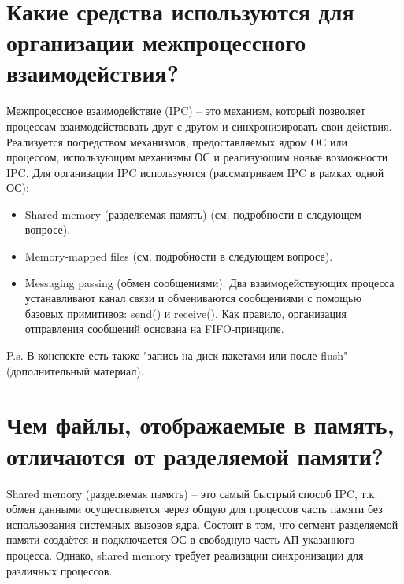 \documentclass[a4paper,12pt]{article}	%
\title{
	\center{\textbf{CQ 21.}}
	}
\begin{document}

\maketitle


\section{Какие средства используются для организации межпроцессного взаимодействия?}
	
	Межпроцессное взаимодействие (IPC) -- это механизм, который позволяет процессам взаимодействовать друг с другом и синхронизировать свои действия. Реализуется посредством механизмов, предоставляемых ядром ОС или процессом, использующим механизмы ОС и реализующим новые возможности IPC. Для организации IPC используются (рассматриваем IPC в рамках одной ОС):
	
	\begin{itemize}
	
		\item Shared memory (разделяемая память) (см. подробности в следующем вопросе).
		
		\item Memory-mapped files (см. подробности в следующем вопросе).
		
		\item Messaging passing (обмен сообщениями). Два взаимодействующих процесса устанавливают канал связи и обмениваются сообщениями с помощью базовых примитивов: send() и receive(). Как правило, организация отправления сообщений основана на FIFO-принципе.
			
	\end{itemize}
	
	P.s. В конспекте есть также "запись на диск пакетами или после flush" (дополнительный материал).
	
\section{Чем файлы, отображаемые в память, отличаются от разделяемой памяти?}

	Shared memory (разделяемая память) -- это самый быстрый способ IPC, т.к. обмен данными осуществляется через общую для процессов часть памяти без использования системных вызовов ядра. Состоит в том, что сегмент разделяемой памяти создаётся и подключается ОС в свободную часть АП указанного процесса. Однако, shared memory требует реализации синхронизации для различных процессов. 
	
\end{document}
